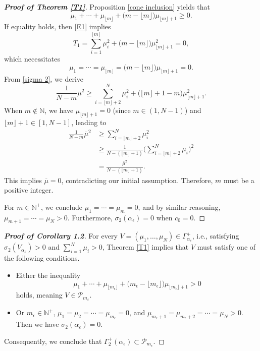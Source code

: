 \documentclass[12pt, twoside]{article}
\theoremstyle{definition}
\numberwithin{equation}{section}
\begin{document}
\begin{proof}[\textbf{Proof of Theorem \ref{T1}}]
Proposition \ref{cone inclusion} yields that
$$\mu_{1}+\cdots+\mu_{\lfloor  m\rfloor}+\big(m-\lfloor m\rfloor\big)\mu_{\lfloor m\rfloor+1}\geq0.$$
If equality holds, then \eqref{E1} implies
$$T_{1}=\sum_{i=1}^{\lfloor m\rfloor}\mu_{i}^{2}+\big(m-\lfloor m\rfloor\big)\mu_{\lfloor m\rfloor+1}^{2}=0,$$
which necessitates
$$\mu_{1}=\cdots=\mu_{\lfloor m\rfloor}=\big(m-\lfloor m\rfloor\big)\mu_{\lfloor m\rfloor+1}=0.$$
From \eqref{sigma 2}, we derive
\begin{equation*}
\frac{1}{N-m}\overline{\mu}^{2}\geq\sum_{i=\lfloor m\rfloor+2}^{N}\mu_{i}^{2}+\big(\lfloor m\rfloor+1-m\big)\mu^{2}_{\lfloor m\rfloor+1}.
\end{equation*}
When $m \notin \mathbb{N}$, we have $\mu_{\lfloor m \rfloor + 1} = 0$ (since $m\in(1,N-1)$) and $\lfloor m \rfloor + 1 \in [1, N-1]$, leading to
\begin{equation*}
\begin{split}
\frac{1}{N-m}\overline{\mu}^{2}&\geq\sum_{i=\lfloor m\rfloor+2}^{N}\mu_{i}^{2}\\
&\geq\frac{1}{N-(\lfloor m\rfloor+1)}\Big(\sum_{i=\lfloor m\rfloor+2}^{N}\mu_{i}\Big)^2\\
&=\frac{\bar{\mu}^{2}}{N-(\lfloor m\rfloor+1)}.
\end{split}
\end{equation*}
This implies $\overline{\mu} = 0$, contradicting our initial assumption. Therefore, $m$ must be a positive integer.

For $m \in \mathbb{N}^{+}$, we conclude $\mu_{1} = \cdots = \mu_{m} = 0$, and by similar reasoning, $\mu_{m+1} = \cdots = \mu_{N} > 0$. Furthermore, $\sigma_{2}(\alpha_{\epsilon})=0$ when $c_{0}=0$.
\end{proof}
\begin{proof}[\textbf{Proof of Corollary 1.2}]
For every $V= (\mu_{1}, \dots, \mu_{N}) \in \Gamma^{+}_{\alpha_{\varepsilon}} $, i.e., satisfying $\sigma_{2}(V_{\alpha_{\varepsilon}}) > 0$ and $ \sum_{i=1}^{N} \mu_{i} > 0$, Theorem \ref{T1} implies that $V$ must satisfy one of the following conditions.
\begin{itemize}
\item[(i)] Either the inequality
$$\mu_{1}+\cdots+\mu_{\lfloor  m_{\epsilon}\rfloor}+\big(m_{\epsilon}-\lfloor m_{\epsilon}\rfloor\big)\mu_{\lfloor m_{\epsilon}\rfloor+1}>0$$
holds, meaning $V \in \mathcal{P}_{m_{\varepsilon}}$.
\item[(ii)] Or $m_{\epsilon} \in \mathbb{N}^{+}$, $\mu_{1} = \mu_{2} = \cdots = \mu_{m_{\epsilon}} = 0$, and $\mu_{m_{\epsilon} + 1} = \mu_{m_{\epsilon} + 2} = \cdots = \mu_{N} > 0$. Then we have  $\sigma_{2}(\alpha_{\varepsilon}) = 0$.
\end{itemize}
Consequently, we conclude that $\Gamma^{+}_{2}(\alpha_{\epsilon}) \subset \mathcal{P}_{m_{\epsilon}}$.
 
 	  
\end{proof}
\end{document}
